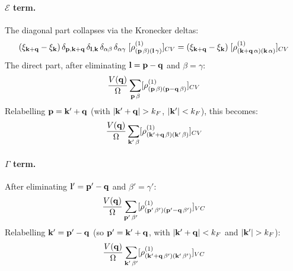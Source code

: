\documentclass[11pt,letterpaper]{article}
\theoremstyle{definition}
\theoremstyle{plain}
\theoremstyle{remark}
\begin{document}
\paragraph{$\mathcal{E}$ term.}
The diagonal part collapses via the Kronecker deltas:
\begin{gather}
    (\xi_{\vb{k}+\vb{q}} - \xi_{\vb{k}})\,\delta_{\vb{p},\vb{k}+\vb{q}}\,\delta_{\vb{l},\vb{k}}\,\delta_{\alpha\beta}\,\delta_{\alpha\gamma}\;[\rho^{(1)}_{(\vb{p}\,\beta)(\vb{l}\,\gamma)}]_{CV} = (\xi_{\vb{k}+\vb{q}} - \xi_{\vb{k}})\;[\rho^{(1)}_{(\vb{k}+\vb{q}\,\alpha)(\vb{k}\,\alpha)}]_{CV}
\end{gather}
The direct part, after eliminating $\vb{l} = \vb{p} - \vb{q}$ and $\beta = \gamma$:
\begin{gather}
    \frac{V(\vb{q})}{\Omega}\sum_{\vb{p}\,\beta} [\rho^{(1)}_{(\vb{p}\,\beta)(\vb{p}-\vb{q}\,\beta)}]_{CV}
\end{gather}
Relabelling $\vb{p} = \vb{k}' + \vb{q}$ (with $\abs{\vb{k}'+\vb{q}} > k_F$, $\abs{\vb{k}'} < k_F$), this becomes:
\begin{gather}
    \frac{V(\vb{q})}{\Omega}\sum_{\vb{k}'\,\beta} [\rho^{(1)}_{(\vb{k}'+\vb{q}\,\beta)(\vb{k}'\,\beta)}]_{CV}
\end{gather}

\paragraph{$\Gamma$ term.}
After eliminating $\vb{l}' = \vb{p}' - \vb{q}$ and $\beta' = \gamma'$:
\begin{gather}
    \frac{V(\vb{q})}{\Omega}\sum_{\vb{p}'\,\beta'} [\rho^{(1)}_{(\vb{p}'\,\beta')(\vb{p}'-\vb{q}\,\beta')}]_{VC}
\end{gather}
Relabelling $\vb{k}' = \vb{p}' - \vb{q}$ (so $\vb{p}' = \vb{k}'+\vb{q}$, with $\abs{\vb{k}'+\vb{q}} < k_F$ and $\abs{\vb{k}'} > k_F$):
\begin{gather}
    \frac{V(\vb{q})}{\Omega}\sum_{\vb{k}'\,\beta'} [\rho^{(1)}_{(\vb{k}'+\vb{q}\,\beta')(\vb{k}'\,\beta')}]_{VC}
\end{gather}
\end{document}
